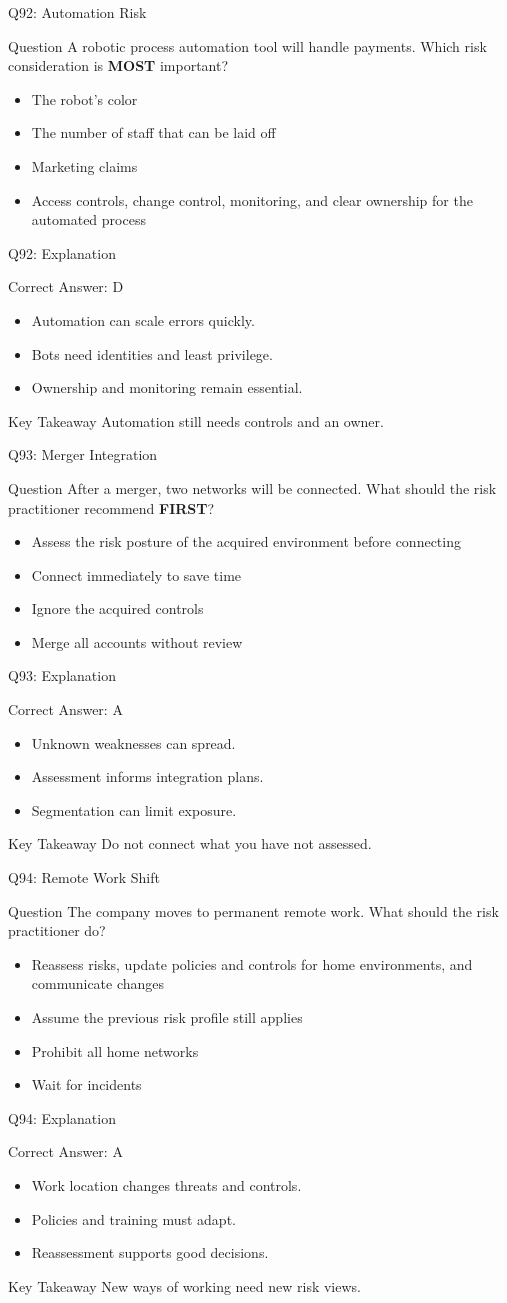 \documentclass[aspectratio=169]{beamer}
\newcommand{\hq}[7]{%
	\begin{frame}{Q#1: #2}
		\begin{block}{Question}
			#3
		\end{block}
		\begin{itemize}
			#4
		\end{itemize}
	\end{frame}
	\begin{frame}{Q#1: Explanation}
		\begin{block}{Correct Answer: #5}
			\begin{itemize}
				#6
			\end{itemize}
		\end{block}
		\begin{alertblock}{Key Takeaway}
			#7
		\end{alertblock}
	\end{frame}
}
\begin{document}
	\hq{92}{Automation Risk}
	{A robotic process automation tool will handle payments. Which risk consideration is \textbf{MOST} important?}
	{\item[\textbf{(A)}] The robot's color
		\item[\textbf{(B)}] The number of staff that can be laid off
		\item[\textbf{(C)}] Marketing claims
		\item[\textbf{(D)}] Access controls, change control, monitoring, and clear ownership for the automated process}
	{D}
	{\item Automation can scale errors quickly.
		\item Bots need identities and least privilege.
		\item Ownership and monitoring remain essential.}
	{Automation still needs controls and an owner.}
	
	\hq{93}{Merger Integration}
	{After a merger, two networks will be connected. What should the risk practitioner recommend \textbf{FIRST}?}
	{\item[\textbf{(A)}] Assess the risk posture of the acquired environment before connecting
		\item[\textbf{(B)}] Connect immediately to save time
		\item[\textbf{(C)}] Ignore the acquired controls
		\item[\textbf{(D)}] Merge all accounts without review}
	{A}
	{\item Unknown weaknesses can spread.
		\item Assessment informs integration plans.
		\item Segmentation can limit exposure.}
	{Do not connect what you have not assessed.}
	
	\hq{94}{Remote Work Shift}
	{The company moves to permanent remote work. What should the risk practitioner do?}
	{\item[\textbf{(A)}] Reassess risks, update policies and controls for home environments, and communicate changes
		\item[\textbf{(B)}] Assume the previous risk profile still applies
		\item[\textbf{(C)}] Prohibit all home networks
		\item[\textbf{(D)}] Wait for incidents}
	{A}
	{\item Work location changes threats and controls.
		\item Policies and training must adapt.
		\item Reassessment supports good decisions.}
	{New ways of working need new risk views.}
	
\end{document}
